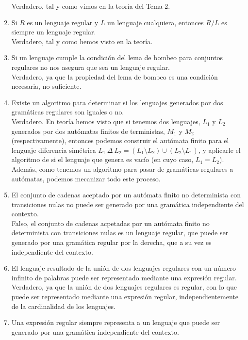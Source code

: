 \begin{enumerate}
        Verdadero, tal y como vimos en la teoría del Tema 2.
    \item Si $R$ es un lenguaje regular y $L$ un lenguaje cualquiera, entonces $R/L$ es siempre un lenguaje regular.\\

        Verdadero, tal y como hemos visto en la teoría.
    \item Si un lenguaje cumple la condición del lema de bombeo para conjuntos regulares no nos asegura que sea un lenguaje regular.\\

        Verdadero, ya que la propiedad del lema de bombeo es una condición necesaria, no suficiente.
    \item Existe un algoritmo para determinar si los lenguajes generados por dos gramáticas regulares son iguales o no.\\

        Verdadero. En teoría hemos visto que si tenemos dos lenguajes, $L_1$ y $L_2$ generados por dos autómatas finitos de terministas, $M_1$ y $M_2$ (respectivamente), entonces podemos construir el autómata finito para el lenguaje diferencia simétrica $L_1 \ \Delta \ L_2=(L_1\setminus L_2)\cup (L_2\setminus L_1)$, y aplicarle el algoritmo de si el lenguaje que genera es vacío (en cuyo caso, $L_1=L_2$). Además, como tenemos un algoritmo para pasar de gramáticas regulares a autómatas, podemos mecanizar todo este proceso.
    \item El conjunto de cadenas aceptado por un autómata finito no determinista con transiciones nulas no puede ser generado por una gramática independiente del contexto.\\

        Falso, el conjunto de cadenas acpetadas por un autómata finito no determinista con transiciones nulas es un lenguaje regular, que puede ser generado por una gramática regular por la derecha, que a su vez es independiente del contexto.
    \item El lenguaje resultado de la unión de dos lenguajes regulares con un número infinito de palabras puede ser representado mediante una expresión regular.\\

        Verdadero, ya que la unión de dos lenguajes regulares es regular, con lo que puede ser representado mediante una expresión regular, independientemente de la cardinalidad de los lenguajes.
    \item Una expresión regular siempre representa a un lenguaje que puede ser generado por una gramática independiente del contexto.\\


\end{enumerate}
